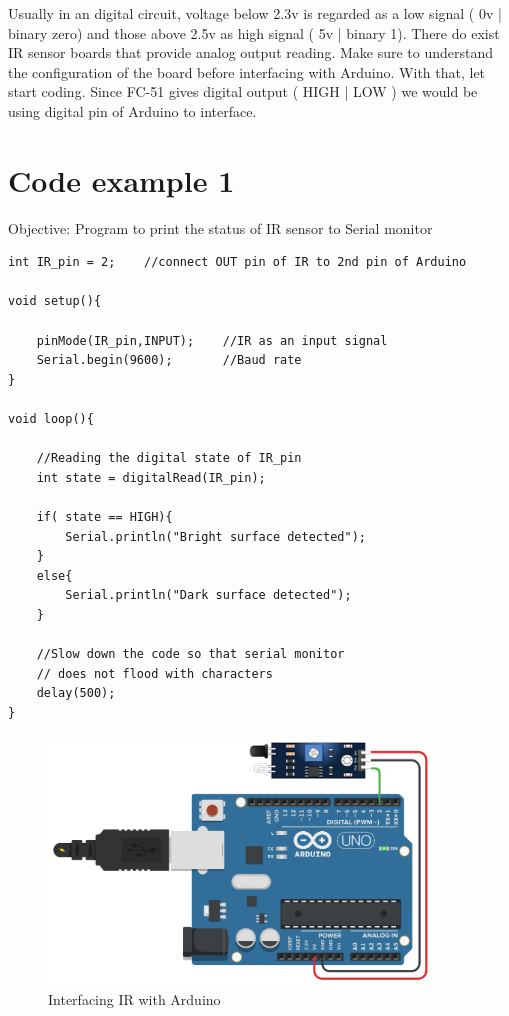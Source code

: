 \hspace{0.5cm}
\par Usually in an digital circuit, voltage below 2.3v is regarded as a low signal ( 0v | binary zero) and those above 2.5v as high signal ( 5v | binary 1). There do exist \ac{IR} sensor boards that provide analog output reading. Make sure to understand the configuration of the board before interfacing with Arduino. With that, let start coding. Since FC-51 gives digital output ( HIGH | LOW ) we would be using digital pin of Arduino to interface.

\section{\textbf{Code example 1}}
Objective: Program to print the status of \ac{IR} sensor to Serial monitor

\begin{lstlisting}[style=CStyle]
int IR_pin = 2;    //connect OUT pin of IR to 2nd pin of Arduino

void setup(){

    pinMode(IR_pin,INPUT);    //IR as an input signal
    Serial.begin(9600);       //Baud rate
}

void loop(){
    
    //Reading the digital state of IR_pin
    int state = digitalRead(IR_pin);	
    
    if( state == HIGH){
        Serial.println("Bright surface detected");
    }
    else{
        Serial.println("Dark surface detected");
    }
    
    //Slow down the code so that serial monitor
    // does not flood with characters
    delay(500);
} 
\end{lstlisting}

\begin{figure}[h!]	
	\centering
	\includegraphics[width=4in]{Images/IR Sensor/circuit1.png}
	\caption{Interfacing \ac{IR} with Arduino}
\end{figure}

